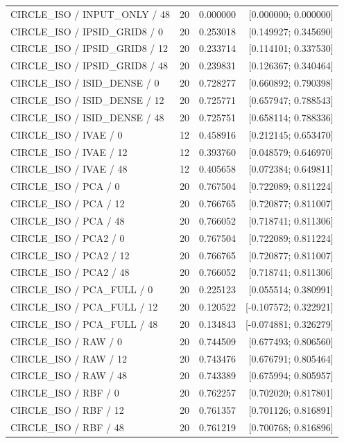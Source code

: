\begin{longtable}{p{.56\linewidth}rrr}
CIRCLE\_ISO / INPUT\_ONLY / 48 & 20 & 0.000000 & [0.000000; 0.000000] \\
CIRCLE\_ISO / IPSID\_GRID8 / 0 & 20 & 0.253018 & [0.149927; 0.345690] \\
CIRCLE\_ISO / IPSID\_GRID8 / 12 & 20 & 0.233714 & [0.114101; 0.337530] \\
CIRCLE\_ISO / IPSID\_GRID8 / 48 & 20 & 0.239831 & [0.126367; 0.340464] \\
CIRCLE\_ISO / ISID\_DENSE / 0 & 20 & 0.728277 & [0.660892; 0.790398] \\
CIRCLE\_ISO / ISID\_DENSE / 12 & 20 & 0.725771 & [0.657947; 0.788543] \\
CIRCLE\_ISO / ISID\_DENSE / 48 & 20 & 0.725751 & [0.658114; 0.788336] \\
CIRCLE\_ISO / IVAE / 0 & 12 & 0.458916 & [0.212145; 0.653470] \\
CIRCLE\_ISO / IVAE / 12 & 12 & 0.393760 & [0.048579; 0.646970] \\
CIRCLE\_ISO / IVAE / 48 & 12 & 0.405658 & [0.072384; 0.649811] \\
CIRCLE\_ISO / PCA / 0 & 20 & 0.767504 & [0.722089; 0.811224] \\
CIRCLE\_ISO / PCA / 12 & 20 & 0.766765 & [0.720877; 0.811007] \\
CIRCLE\_ISO / PCA / 48 & 20 & 0.766052 & [0.718741; 0.811306] \\
CIRCLE\_ISO / PCA2 / 0 & 20 & 0.767504 & [0.722089; 0.811224] \\
CIRCLE\_ISO / PCA2 / 12 & 20 & 0.766765 & [0.720877; 0.811007] \\
CIRCLE\_ISO / PCA2 / 48 & 20 & 0.766052 & [0.718741; 0.811306] \\
CIRCLE\_ISO / PCA\_FULL / 0 & 20 & 0.225123 & [0.055514; 0.380991] \\
CIRCLE\_ISO / PCA\_FULL / 12 & 20 & 0.120522 & [-0.107572; 0.322921] \\
CIRCLE\_ISO / PCA\_FULL / 48 & 20 & 0.134843 & [-0.074881; 0.326279] \\
CIRCLE\_ISO / RAW / 0 & 20 & 0.744509 & [0.677493; 0.806560] \\
CIRCLE\_ISO / RAW / 12 & 20 & 0.743476 & [0.676791; 0.805464] \\
CIRCLE\_ISO / RAW / 48 & 20 & 0.743389 & [0.675994; 0.805957] \\
CIRCLE\_ISO / RBF / 0 & 20 & 0.762257 & [0.702020; 0.817801] \\
CIRCLE\_ISO / RBF / 12 & 20 & 0.761357 & [0.701126; 0.816891] \\
CIRCLE\_ISO / RBF / 48 & 20 & 0.761219 & [0.700768; 0.816896] \\

\end{longtable}

